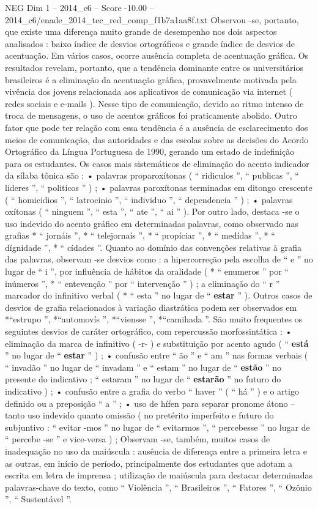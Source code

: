 \begin{textsample}{NEG Dim 1 – 2014\_c6 – Score -10.00 – 2014\_c6/enade\_2014\_tec\_red\_comp\_f1b7a1aa8f.txt}
Observou -se, portanto, que existe uma diferença muito grande de desempenho nos dois aspectos analisados : baixo índice de desvios ortográficos e grande índice de desvios de acentuação.
Em vários casos, ocorre ausência completa de acentuação gráfica.
Os resultados revelam, portanto, que a tendência dominante entre os universitários brasileiros é a eliminação da acentuação gráfica, provavelmente motivada pela vivência dos jovens relacionada aos aplicativos de comunicação via internet ( redes sociais e e-mails ).
Nesse tipo de comunicação, devido ao ritmo intenso de troca de mensagens, o uso de acentos gráficos foi praticamente abolido.
Outro fator que pode ter relação com essa tendência é a ausência de esclarecimento dos meios de comunicação, das autoridades e das escolas sobre as decisões do Acordo Ortográfico da Língua Portuguesa de 1990, gerando um estado de indefinição para os estudantes.
Os casos mais sistemáticos de eliminação do acento indicador da sílaba tônica são : • palavras proparoxítonas ( “ ridiculos ”, “ publicas ”, “ lideres ”, “ politicos ” ) ; • palavras paroxítonas terminadas em ditongo crescente ( “ homicidios ”, “ latrocinio ”, “ individuo ”, “ dependencia ” ) ; • palavras oxítonas ( “ ninguem ”, “ esta ”, “ ate ”, “ ai ” ).
Por outro lado, destaca -se o uso indevido do acento gráfico em determinadas palavras, como observado nas grafias * “ jornáis ”, * “ telejornaís ”, * “ propíciar ”, * “ medídas ”, * “ dígnidade ”, * “ cídades ”.
Quanto ao domínio das convenções relativas à grafia das palavras, observam -se desvios como : a hipercorreção pela escolha de “ e ” no lugar de “ i ”, por influência de hábitos da oralidade ( * “ enumeros ” por “ inúmeros ”, * “ entevenção ” por “ intervenção ” ) ; a eliminação do “ r ” marcador do infinitivo verbal ( * “ esta ” no lugar de “ \textbf{estar} ” ).
Outros casos de desvios de grafia relacionados à variação diastrática podem ser observados em *“estrupo ”, *“automovís ”, *“viensse ”, *“camihada ”.
São muito frequentes os seguintes desvios de caráter ortográfico, com repercussão morfossintática : • eliminação da marca de infinitivo ( -r- ) e substituição por acento agudo ( “ \textbf{está} ” no lugar de “ \textbf{estar} ” ) ; • confusão entre “ ão ” e “ am ” nas formas verbais ( “ invadão ” no lugar de “ invadam ” e “ estam ” no lugar de “ \textbf{estão} ” no presente do indicativo ; “ estaram ” no lugar de “ \textbf{estarão} ” no futuro do indicativo ) ; • confusão entre a grafia do verbo “ haver ” ( “ há ” ) e o artigo definido ou a preposição “ a ” ; • uso de hífen para separar pronome átono – tanto uso indevido quanto omissão ( no pretérito imperfeito e futuro do subjuntivo : “ evitar -mos ” no lugar de “ evitarmos ”, “ percebesse ” no lugar de “ percebe -se ” e vice-versa ) ; Observam -se, também, muitos casos de inadequação no uso da maiúscula : ausência de diferença entre a primeira letra e as outras, em início de período, principalmente dos estudantes que adotam a escrita em letra de imprensa ; utilização de maiúscula para destacar determinadas palavras-chave do texto, como “ Violência ”, “ Brasileiros ”, “ Fatores ”, “ Ozônio ”, “ Sustentável ”.

\end{textsample}
